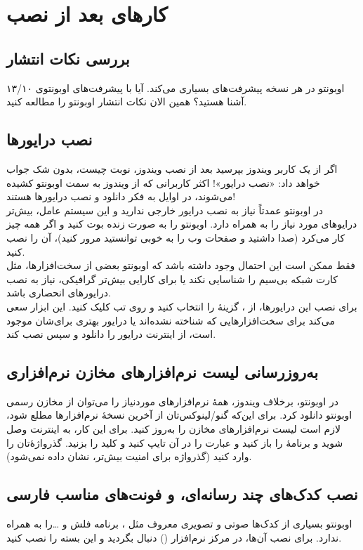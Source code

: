 \chapter{کارهای بعد از نصب}
\section{بررسی نکات انتشار}
 اوبونتو در هر نسخه پیشرفت‌های بسیاری می‌کند. آیا با پیشرفت‌های اوبونتوی ۱۳/۱۰ آشنا هستید؟ همین الان نکات انتشار اوبونتو را مطالعه کنید.

\section{نصب درایورها}
اگر از یک کاربر ویندوز بپرسید بعد از نصب ویندوز، نوبت چیست، بدون شک جواب خواهد داد: «نصب درایور»! اکثر کاربرانی که از ویندوز به سمت اوبونتو کشیده می‌شوند، در اوایل به فکر دانلود و نصب درایورها هستند!\\
در اوبونتو عمدتاً نیاز به نصب درایور خارجی ندارید و این سیستم عامل، بیش‌تر درایوهای مورد نیاز را به همراه دارد. اوبونتو را به صورت زنده بوت کنید و اگر همه چیز کار می‌کرد (صدا داشتید و صفحات وب را به خوبی توانستید مرور کنید)، آن را نصب کنید.\\
فقط ممکن است این احتمال وجود داشته باشد که اوبونتو بعضی از سخت‌افزارها، مثل کارت شبکه بی‌سیم را شناسایی نکند یا برای کارایی بیش‌تر گرافیکی، نیاز به نصب درایورهای انحصاری باشد.\\
برای نصب این درایورها، از ، گزینهٔ  را انتخاب کنید و روی تب  کلیک کنید. این ابزار سعی می‌کند برای سخت‌افزارهایی که شناخته نشده‌اند یا درایور بهتری برای‌شان موجود است، از اینترنت درایور را دانلود و سپس نصب کند.

\section{به‌روزرسانی لیست نرم‌افزارهای مخازن نرم‌افزاری}
در اوبونتو، برخلاف ویندوز، همهٔ نرم‌افزارهای موردنیاز را می‌توان از مخازن رسمی اوبونتو دانلود کرد. برای این‌که گنو/لینوکس‌تان از آخرین نسخهٔ نرم‌افزارها مطلع شود، لازم است لیست نرم‌افزارهای مخازن را به‌روز کنید. برای این کار، به اینترنت وصل شوید و برنامهٔ  را باز کنید و عبارت  را در آن تایپ کنید و کلید  را بزنید. گذرواژه‌ٔ‌تان را وارد کنید (گذرواژه برای امنیت بیش‌تر، نشان داده نمی‌شود).

\section[نصب کدک‌های چند رسانه‌ای، Flash Adobe و فونت‌های مناسب فارسی]{نصب کدک‌های چند رسانه‌ای،  و فونت‌های مناسب فارسی}
اوبونتو بسیاری از کدک‌ها صوتی و تصویری معروف مثل ، برنامه فلش و \ldots  را به همراه ندارد. برای نصب آن‌ها، در مرکز نرم‌افزار () دنبال  بگردید و این بسته را نصب کنید.

